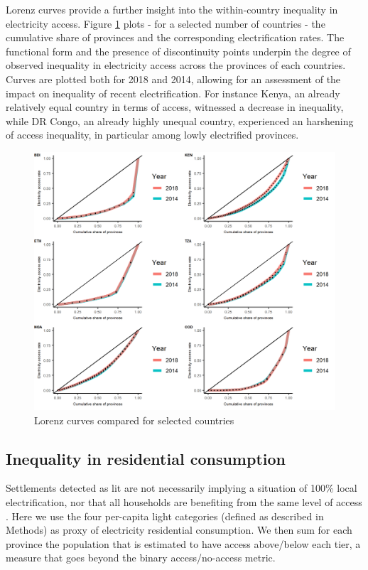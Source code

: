 \documentclass[preprint,12pt]{elsarticle}
\begin{document}
Lorenz curves provide a further insight into the within-country inequality in electricity access. Figure \ref{lorenz} plots - for a selected number of countries - the cumulative share of provinces and the corresponding electrification rates. The functional form and the presence of discontinuity points underpin the degree of observed inequality in electricity access across the provinces of each countries. Curves are plotted both for 2018 and 2014, allowing for an assessment of the impact on inequality of recent electrification. For instance Kenya, an already relatively equal country in terms of access, witnessed a decrease in inequality, while DR Congo, an already highly unequal country, experienced an harshening of access inequality, in particular among lowly electrified provinces. 

\begin{figure}[H]
    \centering
    \includegraphics[scale=0.8]{figures/Lorenz.png} 
    \caption{Lorenz curves compared for selected countries}
    \label{lorenz}
\end{figure}

\subsection{Inequality in residential consumption}
Settlements detected as lit are not necessarily implying a situation of 100\% local electrification, nor that all households are benefiting from the same level of access \citep{riva_merry-go-round_2018}. Here we use the four per-capita light categories (defined as described in Methods) as proxy of electricity residential consumption. We then sum for each province the population that is estimated to have access above/below each tier, a measure that goes beyond the binary access/no-access metric.
\end{document}
